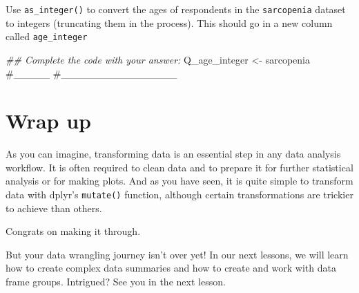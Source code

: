 \documentclass[
  letterpaper,
  DIV=11,
  numbers=noendperiod]{scrreprt}
\newenvironment{Shaded}{\begin{snugshade}}{\end{snugshade}}
\newcommand{\CommentTok}[1]{\textcolor[rgb]{0.37,0.37,0.37}{#1}}
\newcommand{\DocumentationTok}[1]{\textcolor[rgb]{0.37,0.37,0.37}{\textit{#1}}}
\newcommand{\NormalTok}[1]{\textcolor[rgb]{0.00,0.23,0.31}{#1}}
\newcommand{\OtherTok}[1]{\textcolor[rgb]{0.00,0.23,0.31}{#1}}
\begin{document}
\begin{tcolorbox}[enhanced jigsaw, colframe=quarto-callout-tip-color-frame, rightrule=.15mm, opacityback=0, breakable, coltitle=black, colbacktitle=quarto-callout-tip-color!10!white, bottomrule=.15mm, leftrule=.75mm, toprule=.15mm, arc=.35mm, bottomtitle=1mm, colback=white, left=2mm, opacitybacktitle=0.6, titlerule=0mm, title=\textcolor{quarto-callout-tip-color}{\faLightbulb}\hspace{0.5em}{Practice}, toptitle=1mm]

Use \texttt{as\_integer()} to convert the ages of respondents in the
\texttt{sarcopenia} dataset to integers (truncating them in the
process). This should go in a new column called \texttt{age\_integer}

\begin{Shaded}
\begin{Highlighting}[]
\DocumentationTok{\#\# Complete the code with your answer:}
\NormalTok{Q\_age\_integer }\OtherTok{\textless{}{-}} 
\NormalTok{  sarcopenia }\CommentTok{\#\_\_\_\_\_}
  \CommentTok{\#\_\_\_\_\_\_\_\_\_\_\_\_\_\_\_\_}
\end{Highlighting}
\end{Shaded}

\end{tcolorbox}

\hypertarget{wrap-up-5}{%
\section{Wrap up}\label{wrap-up-5}}

As you can imagine, transforming data is an essential step in any data
analysis workflow. It is often required to clean data and to prepare it
for further statistical analysis or for making plots. And as you have
seen, it is quite simple to transform data with dplyr's
\texttt{mutate()} function, although certain transformations are
trickier to achieve than others.

Congrats on making it through.

But your data wrangling journey isn't over yet! In our next lessons, we
will learn how to create complex data summaries and how to create and
work with data frame groups. Intrigued? See you in the next lesson.
\end{document}
